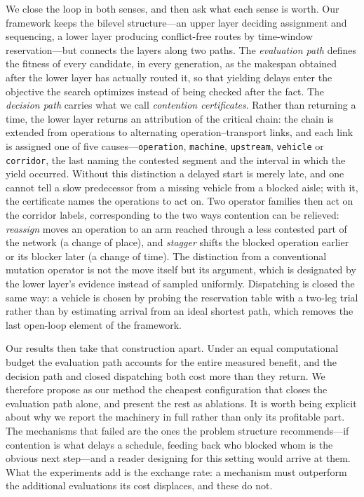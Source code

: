 \documentclass[manuscript,screen,review]{acmart}
\begin{document}
We close the loop in both senses, and then ask what each sense is worth. Our
framework keeps the bilevel structure---an upper layer deciding assignment and
sequencing, a lower layer producing conflict-free routes by time-window
reservation---but connects the layers along two paths. The \emph{evaluation path}
defines the fitness of every candidate, in every generation, as the makespan
obtained after the lower layer has actually routed it, so that yielding delays
enter the objective the search optimizes instead of being checked after the fact.
The \emph{decision path} carries
what we call \emph{contention certificates}. Rather than returning a time, the
lower layer returns an attribution of the critical chain: the chain is extended
from operations to alternating operation--transport links, and each link is
assigned one of five causes---\texttt{operation}, \texttt{machine},
\texttt{upstream}, \texttt{vehicle} or \texttt{corridor}, the last naming the
contested segment and the interval in which the yield occurred. Without this
distinction a delayed start is merely late, and one cannot tell a slow
predecessor from a missing vehicle from a blocked aisle; with it, the certificate
names the operations to act on. Two operator families then act on the corridor
labels, corresponding to the two ways contention can be relieved: \emph{reassign}
moves an operation to an arm reached through a less contested part of the network
(a change of place), and \emph{stagger} shifts the blocked operation earlier or
its blocker later (a change of time). The distinction from a conventional
mutation operator is not the move itself but its argument, which is designated by
the lower layer's evidence instead of sampled uniformly. Dispatching is closed the
same way: a vehicle is chosen by probing the reservation table with a two-leg
trial rather than by estimating arrival from an ideal shortest path, which removes
the last open-loop element of the framework.

Our results then take that construction apart. Under an equal computational
budget the evaluation path accounts for the entire measured benefit, and the
decision path and closed dispatching both cost more than they return. We
therefore propose as our method the cheapest configuration that closes the
evaluation path alone, and present the rest as ablations. It is worth being
explicit about why we report the machinery in full rather than only its
profitable part. The mechanisms that failed are the ones the problem structure
recommends---if contention is what delays a schedule, feeding back who blocked
whom is the obvious next step---and a reader designing for this setting would
arrive at them. What the experiments add is the exchange rate: a mechanism must
outperform the additional evaluations its cost displaces, and these do not.
\end{document}
